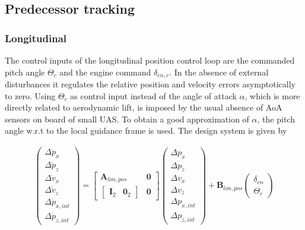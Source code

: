\documentclass{ifacconf}
\newcommand{\mbf}[1]{\mathbf{#1}}
\providecommand{\mbf}[1]{\mathbf{#1}}
\begin{document}

\subsection{Predecessor tracking}

\subsubsection{Longitudinal}
The control inputs of the longitudinal position control loop are the commanded pitch angle $\Theta_c$ and the engine command $\delta_{en,c}$. In the absence of external disturbances it regulates the relative position and velocity errors asymptotically to zero. Using $\Theta_c$ as control input instead of the angle of attack $\alpha$, which is more directly related to aerodynamic lift, is imposed by the usual absence of AoA sensors on board of small UAS. To obtain a good approximation of $\alpha$, the pitch angle w.r.t to the local guidance frame is used. The design system is given by

\begin{align}
\begin{pmatrix}
\Delta \dot{p}_x \\
\Delta \dot{p}_z \\
\Delta \dot{v}_x \\
\Delta \dot{v}_z \\
\Delta \dot{p}_{x,int} \\
\Delta \dot{p}_{z,int} 
\end{pmatrix}
=
\begin{bmatrix}
\mbf{
A
}_{lon, pos} 
& 
\mbf{0} 
\\
\begin{bmatrix}
\mbf{I}_2 & \mbf{0}_{2}
\end{bmatrix}
& 
\mbf{0}
\end{bmatrix}
\begin{pmatrix}
\Delta {p}_x \\
\Delta {p}_z \\
\Delta {v}_x \\
\Delta {v}_z \\
\Delta {p}_{x,int} \\
\Delta {p}_{z,int} 
\end{pmatrix}
+
\mbf{
B
}_{lon, pos}
\begin{pmatrix}
\delta_{en} \\
\Theta_c
\end{pmatrix}
\end{align}
\end{document}
